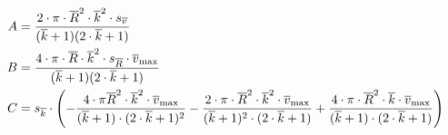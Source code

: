 \begin{align}
    \label{eq:errorTurbulent:complicated}
    A
    &=
    \frac{%
        2
        \cdot
        \pi
        \cdot
        \overline{R}^2
        \cdot
        \overline{k}^2
        \cdot
        s_{\overline{v}}
    }{%
        (
            \overline{k}
            +
            1
        )
        (
            2
            \cdot
            \overline{k}
            +
            1
        )
    }
    \\
    B
    &=
    \frac{%
        4
        \cdot
        \pi
        \cdot
        \overline{R}
        \cdot
        \overline{k}^2
        \cdot
        s_{\overline{R}}
        \cdot
        \overline{v}_{\mathrm{max}}
    }{%
        (
            \overline{k}
            +
            1
        )
        (
            2
            \cdot
            \overline{k}
            +
            1
        )
    }
    \\
    C
    &=
    s_{\overline{k}}
    \cdot
    \left(
        -
        \frac{%
            4
            \cdot
            \pi
            \overline{R}^2
            \cdot
            \overline{k}^2
            \cdot
            \overline{v}_{\mathrm{max}}
        }{%
            (
                \overline{k}
                +
                1
            )
            \cdot
            (
                2
                \cdot
                \overline{k}
                +
                1
            )^2
        }
        -
        \frac{%
            2
            \cdot
            \pi
            \cdot
            \overline{R}^2
            \cdot
            \overline{k}^2
            \cdot
            \overline{v}_{\mathrm{max}}
        }{%
            (
                \overline{k}
                +
                1
            )^2
            \cdot
            (
                2
                \cdot
                \overline{k}
                +
                1
            )
        }
        +
        \frac{%
            4
            \cdot
            \pi
            \cdot
            \overline{R}^2
            \cdot
            \overline{k}
            \cdot
            \overline{v}_{\mathrm{max}}
        }{%
            (
                \overline{k}
                +
                1
            )
            \cdot
            (
                2
                \cdot
                \overline{k}
                +
                1
            )
        }
    \right)
\end{align}


